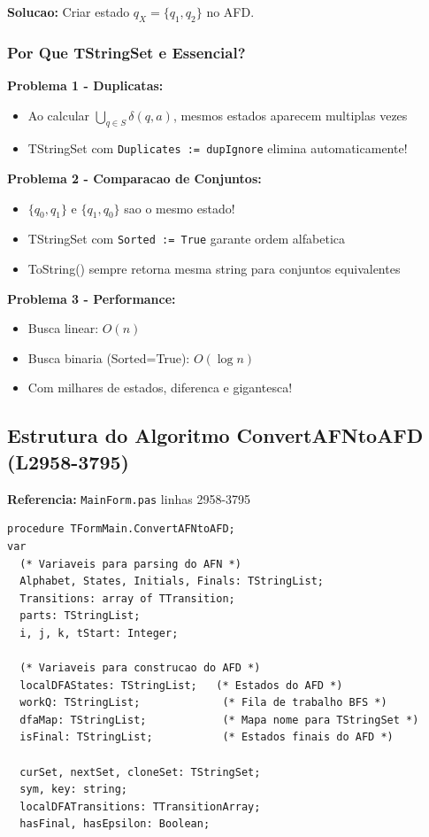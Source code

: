 \documentclass[12pt,a4paper]{article}
\begin{document}
\textbf{Solucao:} Criar estado $q_X = \{q_1, q_2\}$ no AFD.

\subsubsection{Por Que TStringSet e Essencial?}

\textbf{Problema 1 - Duplicatas:}
\begin{itemize}
    \item Ao calcular $\bigcup_{q \in S} \delta(q, a)$, mesmos estados aparecem multiplas vezes
    \item TStringSet com \texttt{Duplicates := dupIgnore} elimina automaticamente!
\end{itemize}

\textbf{Problema 2 - Comparacao de Conjuntos:}
\begin{itemize}
    \item $\{q_0, q_1\}$ e $\{q_1, q_0\}$ sao o mesmo estado!
    \item TStringSet com \texttt{Sorted := True} garante ordem alfabetica
    \item ToString() sempre retorna mesma string para conjuntos equivalentes
\end{itemize}

\textbf{Problema 3 - Performance:}
\begin{itemize}
    \item Busca linear: $O(n)$
    \item Busca binaria (Sorted=True): $O(\log n)$
    \item Com milhares de estados, diferenca e gigantesca!
\end{itemize}

\subsection{Estrutura do Algoritmo ConvertAFNtoAFD (L2958-3795)}

\textbf{Referencia:} \texttt{MainForm.pas} linhas 2958-3795

\begin{lstlisting}[style=pascal, caption={Declaracoes}]
procedure TFormMain.ConvertAFNtoAFD;
var
  (* Variaveis para parsing do AFN *)
  Alphabet, States, Initials, Finals: TStringList;
  Transitions: array of TTransition;
  parts: TStringList;
  i, j, k, tStart: Integer;
  
  (* Variaveis para construcao do AFD *)
  localDFAStates: TStringList;   (* Estados do AFD *)
  workQ: TStringList;             (* Fila de trabalho BFS *)
  dfaMap: TStringList;            (* Mapa nome para TStringSet *)
  isFinal: TStringList;           (* Estados finais do AFD *)
  
  curSet, nextSet, cloneSet: TStringSet;
  sym, key: string;
  localDFATransitions: TTransitionArray;
  hasFinal, hasEpsilon: Boolean;
\end{lstlisting}
\end{document}
